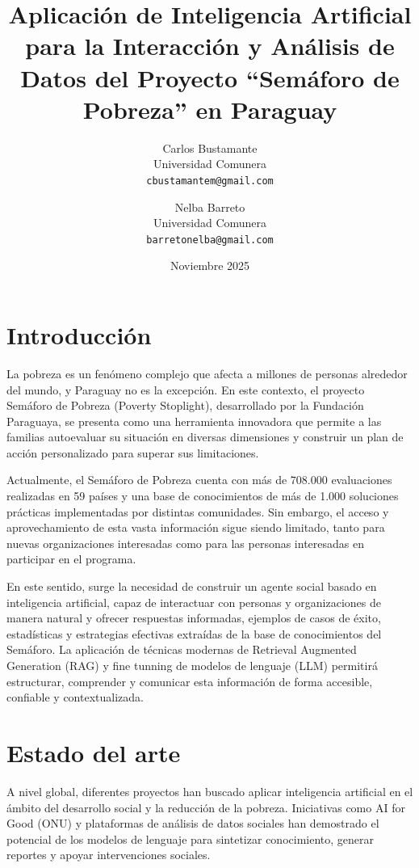 \documentclass{article}
\begin{document}
\hyphenation{}

\title{Aplicación de Inteligencia Artificial para la Interacción y Análisis de Datos del Proyecto “Semáforo de Pobreza” en Paraguay}

\author{
  Carlos Bustamante \\
  Universidad Comunera \\
  \texttt{cbustamantem@gmail.com}
  \and
  Nelba Barreto \\
  Universidad Comunera \\
  \texttt{barretonelba@gmail.com}
}

\date{Noviembre 2025}
\maketitle

\section{Introducción}\label{sec:introduccion}
La pobreza es un fenómeno complejo que afecta a millones de personas alrededor del mundo, y Paraguay no es la excepción. En este contexto, el proyecto Semáforo de Pobreza (Poverty Stoplight), desarrollado por la Fundación Paraguaya, se presenta como una herramienta innovadora que permite a las familias autoevaluar su situación en diversas dimensiones y construir un plan de acción personalizado para superar sus limitaciones.

Actualmente, el Semáforo de Pobreza cuenta con más de 708.000 evaluaciones realizadas en 59 países y una base de conocimientos de más de 1.000 soluciones prácticas implementadas por distintas comunidades. Sin embargo, el acceso y aprovechamiento de esta vasta información sigue siendo limitado, tanto para nuevas organizaciones interesadas como para las personas interesadas en participar en el programa.

En este sentido, surge la necesidad de construir un agente social basado en inteligencia artificial, capaz de interactuar con personas y organizaciones de manera natural y ofrecer respuestas informadas, ejemplos de casos de éxito, estadísticas y estrategias efectivas extraídas de la base de conocimientos del Semáforo. La aplicación de técnicas modernas de Retrieval Augmented Generation (RAG) y fine tunning de modelos de lenguaje (LLM) permitirá estructurar, comprender y comunicar esta información de forma accesible, confiable y contextualizada.

\section{Estado del arte}\label{sec:estadoArte}
A nivel global, diferentes proyectos han buscado aplicar inteligencia artificial en el ámbito del desarrollo social y la reducción de la pobreza. Iniciativas como AI for Good (ONU) y plataformas de análisis de datos sociales han demostrado el potencial de los modelos de lenguaje para sintetizar conocimiento, generar reportes y apoyar intervenciones sociales.
\end{document}
